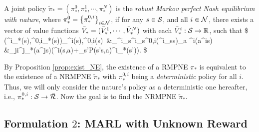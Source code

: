 \begin{definition}\label{def:robust_NNE}
	A joint policy $\tilde{\pi}_*=(\pi^0_*,\pi^1_*,\cdots,\pi^N_*)$ is the \emph{robust Markov perfect Nash equilibrium with nature}, where $\pi^0_*=\big\{\pi^{0,i}_*\big\}_{i\in\mathcal{N}}$,  if for any $s\in{\mathcal{S}}$, and all $i\in\mathcal{N}$, there exists a vector of value functions $\bar{V}_*=(\bar{V}_*^1,\cdots,\bar{V}_*^N)$ with each $\bar{V}^i_*:{\mathcal{S}}\to\mathbb{R}$, such that
	\$
	\big(\pi^i_*(\cdot\given s),\pi^{0,i}_*(\cdot\given s)\big)\in\argmaxmin_{\pi^i(\cdot\given s),\pi^{0,i}(\cdot\given s)}~&\sum_{\oR^i_s\in \ocR^i_s}\pi^{0,i}\big(\oR^i_s\biggiven  s\big)\sum_{a\in\cA} \pi^i(a^i\given s)\\
	&\quad\prod_{j\neq i}\pi^j_*(a^j\given s)\bigg(\oR^i(s,a)+\gamma \sum_{s'\in\cS}P(s'\given s,a)\oV^i_*(s')\bigg). 
	\$
	\normalsize
\end{definition}

By Proposition \ref{prop:exist_NE}, the existence of a RMPNE $\pi_*$ is equivalent to the existence of a NRMPNE $\tilde{\pi}_*$ with $\pi^{0,i}_*$ being a \emph{deterministic} policy for all $i$. Thus, we will only consider the nature's policy as a deterministic one hereafter, i.e., $\pi^{0,i}_*:{\mathcal{S}}\to \bar{\mathcal{R}}$. Now the goal is to find the NRMPNE $\tilde \pi_*$. 
 

\subsection{Formulation $2$: MARL with Unknown Reward}\label{sec:unknown_reward_form} 

